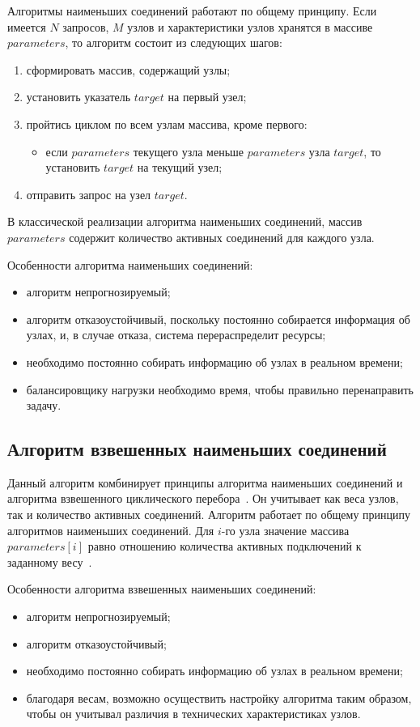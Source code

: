 Алгоритмы наименьших соединений работают по общему принципу.
Если имеется $N$ запросов, $M$ узлов и характеристики узлов хранятся в массиве $parameters$, то алгоритм состоит из следующих шагов:
\begin{enumerate}
	\item сформировать массив, содержащий узлы;
	\item установить указатель $target$ на первый узел;
	\item пройтись циклом по всем узлам массива, кроме первого:
	\begin{itemize}
		\item если $parameters$ текущего узла меньше $parameters$ узла $target$, то установить $target$ на текущий узел; 
	\end{itemize}
	\item отправить запрос на узел $target$.
\end{enumerate}

В классической реализации алгоритма наименьших соединений, массив $parameters$ содержит количество активных соединений для каждого узла.

Особенности алгоритма наименьших соединений:
\begin{itemize}
	\item алгоритм непрогнозируемый; 
	\item алгоритм отказоустойчивый, поскольку постоянно собирается информация об узлах, и, в случае отказа, система перераспределит ресурсы;
	\item необходимо постоянно собирать информацию об узлах в реальном времени;
	\item балансировщику нагрузки необходимо время, чтобы правильно перенаправить задачу.
\end{itemize}

\subsection*{Алгоритм взвешенных наименьших соединений}

Данный алгоритм комбинирует принципы алгоритма наименьших соединений и алгоритма взвешенного циклического перебора~\cite{part_algos}.
Он учитывает как веса узлов, так и количество активных соединений. 
Алгоритм работает по общему принципу алгоритмов наименьших соединений. Для $i$-го узла значение массива $parameters[i]$ равно отношению количества активных подключений к заданному весу~\cite{mainsource}.

Особенности алгоритма взвешенных наименьших соединений:
\begin{itemize}
	\item алгоритм непрогнозируемый; 
	\item алгоритм отказоустойчивый;
	\item необходимо постоянно собирать информацию об узлах в реальном времени;
	\item благодаря весам, возможно осуществить настройку алгоритма таким образом, чтобы он учитывал различия в технических характеристиках узлов.
\end{itemize}


